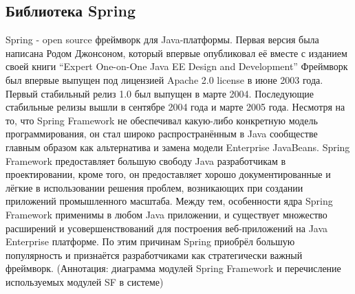 \documentclass[14pt,a4paper]{reportmod}
\begin{document}
\subsection{Библиотека Spring}
Spring - open source фреймворк для Java-платформы. Первая версия была написана Родом Джонсоном, который впервые опубликовал её вместе с изданием своей книги ``Expert One-on-One Java EE Design and Development''
Фреймворк был впервые выпущен под лицензией Apache 2.0 license в июне 2003 года. Первый стабильный релиз 1.0 был выпущен в марте 2004. Последующие стабильные релизы вышли в сентябре 2004 года и марте 2005 года.
Несмотря на то, что Spring Framework не обеспечивал какую-либо конкретную модель программирования, он стал широко распространённым в Java сообществе главным образом как альтернатива и замена модели Enterprise JavaBeans. Spring Framework предоставляет большую свободу Java разработчикам в проектировании, кроме того, он предоставляет хорошо документированные и лёгкие в использовании решения проблем, возникающих при создании приложений промышленного масштаба.
Между тем, особенности ядра Spring Framework применимы в любом Java приложении, и существует множество расширений и усовершенствований для построения веб-приложений на Java Enterprise платформе. По этим причинам Spring приобрёл большую популярность и признаётся разработчиками как стратегически важный фреймворк.
(Аннотация: диаграмма модулей Spring Framework и перечисление используемых модулей SF в системе)
\end{document}
